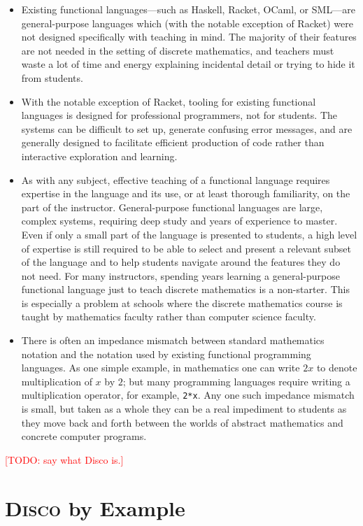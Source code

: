 \documentclass[submission,copyright,creativecommons]{eptcs}
\newcommand{\disco}{\textsc{Disco}\xspace}
\newcommand{\todo}[1]{\textcolor{red}{[TODO: #1]}}
\newcommand{\todo}[1]{}
\begin{document}
\begin{itemize}
\item Existing functional languages---such as Haskell, Racket, OCaml,
  or SML---are general-purpose languages which (with the notable
  exception of Racket) were not designed specifically with teaching in
  mind.  The majority of their features are not needed in the setting
  of discrete mathematics, and teachers must waste a lot of time and
  energy explaining incidental detail or trying to hide it from
  students.
\item With the notable exception of Racket, tooling for existing
  functional languages is designed for professional programmers, not
  for students.  The systems can be difficult to set up, generate
  confusing error messages, and are generally designed to facilitate
  efficient production of code rather than interactive exploration and
  learning.
\item As with any subject, effective teaching of a functional language
  requires expertise in the language and its use, or at least thorough
  familiarity, on the part of the instructor. General-purpose
  functional languages are large, complex systems, requiring deep
  study and years of experience to master.  Even if only a small part
  of the language is presented to students, a high level of expertise
  is still required to be able to select and present a relevant subset
  of the language and to help students navigate around the features
  they do not need.  For many instructors, spending years learning a
  general-purpose functional language just to teach discrete
  mathematics is a non-starter.  This is especially a problem at
  schools where the discrete mathematics course is taught by
  mathematics faculty rather than computer science faculty.
\item There is often an impedance mismatch between standard
  mathematics notation and the notation used by existing functional
  programming languages.  As one simple example, in mathematics one
  can write $2x$ to denote multiplication of $x$ by $2$; but many
  programming languages require writing a multiplication operator, for
  example, \texttt{2*x}.  Any one such impedance mismatch is small, but taken
  as a whole they can be a real impediment to students as they move
  back and forth between the worlds of abstract mathematics and
  concrete computer programs.
\end{itemize}

\todo{say what Disco is.}

\section{\disco by Example}
\end{document}
